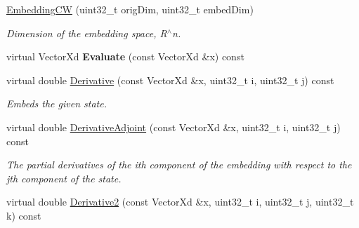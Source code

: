 \begin{DoxyCompactItemize}
\item 
\hypertarget{struct_d_r_d_s_p_1_1_embedding_c_w_a36beb21857003df4f283dd1f0459b178}{\hyperlink{struct_d_r_d_s_p_1_1_embedding_c_w_a36beb21857003df4f283dd1f0459b178}{Embedding\-C\-W} (uint32\-\_\-t orig\-Dim, uint32\-\_\-t embed\-Dim)}\label{struct_d_r_d_s_p_1_1_embedding_c_w_a36beb21857003df4f283dd1f0459b178}

\begin{DoxyCompactList}\small\item\em Dimension of the embedding space, R$^\wedge$n. \end{DoxyCompactList}\item 
\hypertarget{struct_d_r_d_s_p_1_1_embedding_c_w_a630cb32ea4cf52cc278c89322a944257}{virtual Vector\-Xd {\bfseries Evaluate} (const Vector\-Xd \&x) const }\label{struct_d_r_d_s_p_1_1_embedding_c_w_a630cb32ea4cf52cc278c89322a944257}

\item 
\hypertarget{struct_d_r_d_s_p_1_1_embedding_c_w_ae7e3c46b785e7b023119238a0d8cc0db}{virtual double \hyperlink{struct_d_r_d_s_p_1_1_embedding_c_w_ae7e3c46b785e7b023119238a0d8cc0db}{Derivative} (const Vector\-Xd \&x, uint32\-\_\-t i, uint32\-\_\-t j) const }\label{struct_d_r_d_s_p_1_1_embedding_c_w_ae7e3c46b785e7b023119238a0d8cc0db}

\begin{DoxyCompactList}\small\item\em Embeds the given state. \end{DoxyCompactList}\item 
\hypertarget{struct_d_r_d_s_p_1_1_embedding_c_w_a0350d8d148c7816ae8b2ee27bf4f54cd}{virtual double \hyperlink{struct_d_r_d_s_p_1_1_embedding_c_w_a0350d8d148c7816ae8b2ee27bf4f54cd}{Derivative\-Adjoint} (const Vector\-Xd \&x, uint32\-\_\-t i, uint32\-\_\-t j) const }\label{struct_d_r_d_s_p_1_1_embedding_c_w_a0350d8d148c7816ae8b2ee27bf4f54cd}

\begin{DoxyCompactList}\small\item\em The partial derivatives of the ith component of the embedding with respect to the jth component of the state. \end{DoxyCompactList}\item 
\hypertarget{struct_d_r_d_s_p_1_1_embedding_c_w_a98b06fcd2b37246b967ff2660be15568}{virtual double \hyperlink{struct_d_r_d_s_p_1_1_embedding_c_w_a98b06fcd2b37246b967ff2660be15568}{Derivative2} (const Vector\-Xd \&x, uint32\-\_\-t i, uint32\-\_\-t j, uint32\-\_\-t k) const }\label{struct_d_r_d_s_p_1_1_embedding_c_w_a98b06fcd2b37246b967ff2660be15568}


\end{DoxyCompactItemize}
